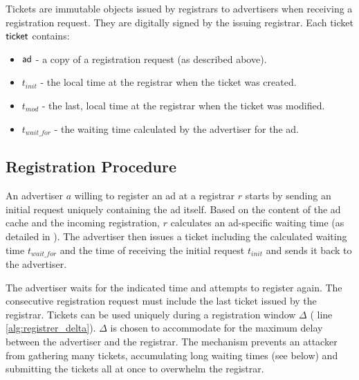 Tickets are immutable objects issued by registrars to advertisers when receiving a registration request. 
They are digitally signed by the issuing registrar.
Each ticket $\mathsf{ticket}$ contains:
\begin{itemize}
    \item $\mathsf{ad}$ - a copy of a registration request (as described above). 
    \item $t_\textit{init}$ - the local time at the registrar when the ticket was created.
    \item $t_\textit{mod}$ - the last, local time at the registrar when the ticket was modified.
    \item $t_\textit{wait\_for}$ - the waiting time calculated by the advertiser for the ad.
\end{itemize}


\subsection{Registration Procedure}
An advertiser $a$ willing to register an ad at a registrar $r$ starts by sending an initial request uniquely containing the ad itself. Based on the
content of the ad cache and the incoming registration, $r$ calculates an ad-specific waiting time (as detailed in ). 
The advertiser then issues a ticket including the calculated waiting time $t_\textit{wait\_for}$ and the time of receiving the initial request $t_\textit{init}$ and sends it back to the advertiser.

The advertiser waits for the indicated time and attempts to register again. The consecutive registration request must include the last ticket issued by the registrar. Tickets can be used uniquely during a registration window $\Delta$ ( line \ref{alg:registrer_delta}).
$\Delta$ is chosen to accommodate for the maximum delay between the advertiser and the registrar. The mechanism prevents an attacker from gathering many tickets, accumulating long waiting times (see below) and submitting the tickets all at once to overwhelm the registrar. 

